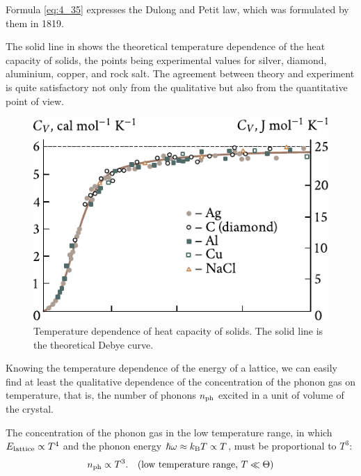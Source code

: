 Formula \eqref{eq:4_35} expresses the Dulong and Petit law, which was formulated by them in 1819.

The solid line in  shows the theoretical temperature dependence of the heat capacity of solids, the points being experimental values for silver, diamond, aluminium, copper, and rock salt. The agreement between theory and experiment is quite satisfactory not only from the qualitative but also from the quantitative point of view.

\begin{figure}[t]
	\begin{center}
		\includegraphics[scale=0.98]{figures/ch_04/fig_4_5.pdf}
		\caption[]{Temperature dependence of heat capacity of solids. The solid line is the theoretical Debye curve.}
		\label{fig:4_5}
	\end{center}
	\vspace{-0.6cm}
\end{figure}

Knowing the temperature dependence of the energy of a lattice, we can easily find at least the qualitative dependence of the concentration of the phonon gas on temperature, that is, the number of phonons $n_{\text{ph}}$ excited in a unit of volume of the crystal.

The concentration of the phonon gas in the low temperature range, in which $E_{\text{lattice}}\propto T^4$ and the phonon energy $\hslash\omega\approx k_{\text{B}}T\propto T$, must be proportional to $T^3$:
\begin{equation}\label{eq:4_36}
    n_{\text{ph}} \propto T^3.\quad \text{(low temperature range, $T\ll\Theta$)}
\end{equation}

